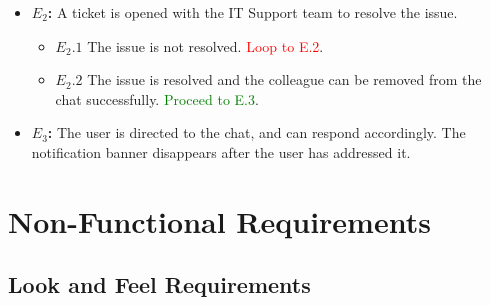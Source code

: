\documentclass[]{article}
\begin{document}
\begin{enumerate}[\bf {BE}11.]
{{\begin{itemize}
					\item {\bf $E_{2}$:}  A ticket is opened with the IT Support team to resolve the issue.
					      \begin{itemize}
						      \item {\bf $E_{2}.1$} The issue is not resolved. \textcolor{red}{Loop to E.2}.
						      \item {\bf $E_{2}.2$} The issue is resolved and the colleague can be removed from the chat successfully. \textcolor{green}{Proceed to E.3}.
					      \end{itemize}
					\item {\bf $E_{3}$:}  The user is directed to the chat, and can respond accordingly. The notification banner disappears after the user has addressed it.
				\end{itemize}

			}%
		}%
\end{enumerate}


\section{Non-Functional Requirements}
\label{sec:non-functional_requirements}

\subsection{Look and Feel Requirements}
\label{sub:look_and_feel_requirements}
\end{document}

